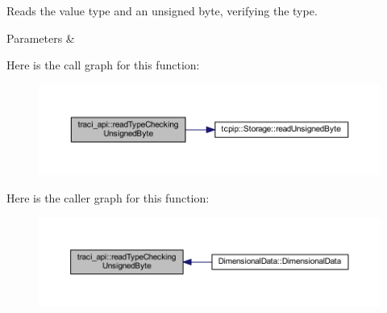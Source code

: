 Reads the value type and an unsigned byte, verifying the type. 


\begin{DoxyParams}{Parameters}
{\em } & \\
\hline
\end{DoxyParams}
Here is the call graph for this function\+:\nopagebreak
\begin{figure}[H]
\begin{center}
\leavevmode
\includegraphics[width=350pt]{namespacetraci__api_ac95893093cb3b220faafd74ce62abba3_cgraph}
\end{center}
\end{figure}
Here is the caller graph for this function\+:\nopagebreak
\begin{figure}[H]
\begin{center}
\leavevmode
\includegraphics[width=350pt]{namespacetraci__api_ac95893093cb3b220faafd74ce62abba3_icgraph}
\end{center}
\end{figure}
